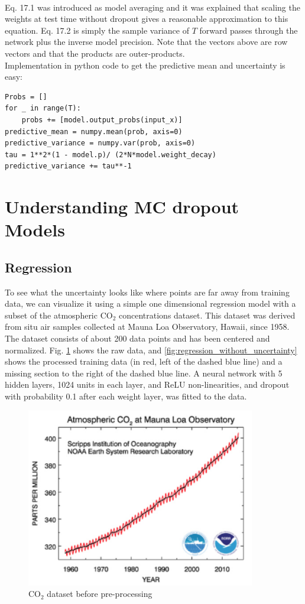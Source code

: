 \\
Eq. 17.1 was introduced as model averaging and it was explained that scaling the weights at test time without dropout gives a reasonable approximation to this equation. Eq. 17.2 is simply the sample variance of $T$ forward passes through the network plus the inverse model precision. Note that the vectors above are row vectors and that the products are outer-products.
\\
Implementation in python code to get the predictive mean and uncertainty is easy:

\begin{verbatim}
Probs = []
for _ in range(T):
    probs += [model.output_probs(input_x)]
predictive_mean = numpy.mean(prob, axis=0)
predictive_variance = numpy.var(prob, axis=0)
tau = 1**2*(1 - model.p)/ (2*N*model.weight_decay)
predictive_variance += tau**-1
\end{verbatim}

\section{Understanding MC dropout Models}
\subsection{Regression}
To see what the uncertainty looks like where points are far away from training data, we can visualize it using a simple one dimensional regression model with a subset of the atmospheric CO$_2$ concentrations dataset. This dataset was derived from situ air samples collected at Mauna Loa Observatory, Hawaii, since 1958. The dataset consists of about 200 data points and has been centered and normalized. Fig. \ref{fig:co2_concentration} shows the raw data, and \ref{fig:regression_without_uncertainty} shows the processed training data (in red, left of the dashed blue line) and a missing section to the right of the dashed blue line. A neural network with 5 hidden layers, 1024 units in each layer, and ReLU non-linearities, and dropout with probability 0.1 after each weight layer, was fitted to the data.

\begin{figure}[H]
    \centering
    \includegraphics[width=10cm]{labs/12/images/CO2 concentration.png}
    \caption{CO$_2$ dataset before pre-processing}
    \label{fig:co2_concentration}
\end{figure}

